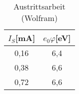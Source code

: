 \begin{table}[h]
	\begin{center}
		\begin{tabular}{cc}
			$I_S$[mA]& $e_0\varphi$[eV] \\ \hline
			0{,}16 & 6{,}4 \\
			0{,}38 & 6{,}6\\
			0{,}72 & 6{,}6
		\end{tabular}
		\caption{Austrittsarbeit (Wolfram)}
		\label{tabe1}
	\end{center}
\end{table}